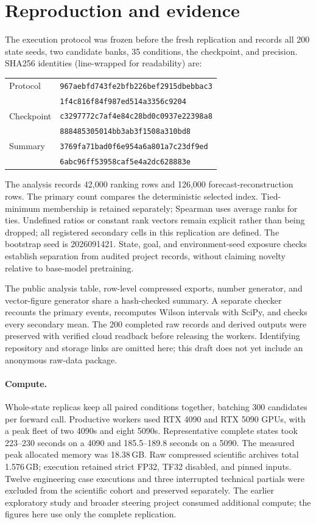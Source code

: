 \documentclass{article}
\begin{document}
\section{Reproduction and evidence}
\label{app:repro}
The execution protocol was frozen before the fresh replication and records all 200 state seeds, two candidate banks, 35 conditions, the checkpoint, and precision. SHA256 identities (line-wrapped for readability) are:
\begin{center}\small
\begin{tabular}{ll}
\toprule
Protocol & \texttt{967aebfd743fe2bfb226bef2915dbebbac3}\\
 & \texttt{1f4c816f84f987ed514a3356c9204}\\
Checkpoint & \texttt{c3297772c7af4e84c28bd0c0937e22398a8}\\
 & \texttt{888485305014bb3ab3f1508a310bd8}\\
Summary & \texttt{3769fa71bad0f6e954a6a801a7c23df9ed}\\
 & \texttt{6abc96ff53958caf5e4a2dc628883e}\\
\bottomrule
\end{tabular}
\end{center}
The analysis records 42,000 ranking rows and 126,000 forecast-reconstruction rows. The primary count compares the deterministic selected index. Tied-minimum membership is retained separately; Spearman uses average ranks for ties. Undefined ratios or constant rank vectors remain explicit rather than being dropped; all registered secondary cells in this replication are defined. The bootstrap seed is 2026091421. State, goal, and environment-seed exposure checks establish separation from audited project records, without claiming novelty relative to base-model pretraining.

The public analysis table, row-level compressed exports, number generator, and vector-figure generator share a hash-checked summary. A separate checker recounts the primary events, recomputes Wilson intervals with SciPy, and checks every secondary mean. The 200 completed raw records and derived outputs were preserved with verified cloud readback before releasing the workers. Identifying repository and storage links are omitted here; this draft does not yet include an anonymous raw-data package.

\paragraph{Compute.}
Whole-state replicas keep all paired conditions together, batching 300 candidates per forward call. Productive workers used RTX 4090 and RTX 5090 GPUs, with a peak fleet of two 4090s and eight 5090s. Representative complete states took 223--230 seconds on a 4090 and 185.5--189.8 seconds on a 5090. The measured peak allocated memory was 18.38\,GB. Raw compressed scientific archives total 1.576\,GB; execution retained strict FP32, TF32 disabled, and pinned inputs. Twelve engineering case executions and three interrupted technical partials were excluded from the scientific cohort and preserved separately. The earlier exploratory study and broader steering project consumed additional compute; the figures here use only the complete replication.
\end{document}

